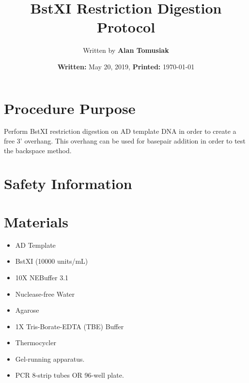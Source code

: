 \documentclass{ssiBio}
\title{BstXI Restriction Digestion Protocol}
\author{Written by \textbf{Alan Tomusiak}}
\date{\textbf{Written:} May 20, 2019, \textbf{Printed:} \today{}}
\begin{document}
\maketitle
\section{Procedure Purpose}
Perform BstXI restriction digestion on AD template DNA in order to create a free 3' overhang. This overhang can be used for basepair addition in order to test the backspace method.

\section{Safety Information}
\begin{safety}
  \begin{enumerate}
    \SYBRGOLD
  \end{enumerate}
\end{safety}

\section{Materials}
\begin{itemize}
  \item{AD Template}
  \item{BstXI (10000 units/mL)}
  \item{10X NEBuffer 3.1}
  \item{Nuclease-free Water}
  \item{Agarose}
  \item{1X Tris-Borate-EDTA (TBE) Buffer}
  \item{Thermocycler}
  \item{Gel-running apparatus.}
  \item{PCR 8-strip tubes OR 96-well plate.}
\end{itemize}
\end{document}
